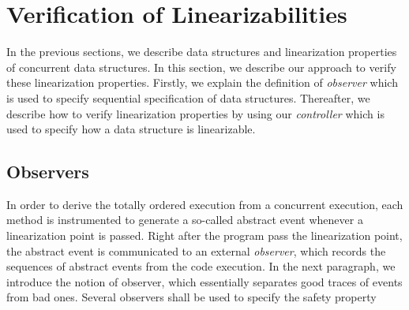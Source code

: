 \chapter{Verification of Linearizabilities}
In the previous sections, we describe data structures and linearization properties of concurrent data structures. In this section, we describe our approach to verify these linearization properties. Firstly, we explain the definition of \emph{observer} which is used to specify sequential specification of data structures. Thereafter, we describe how to verify linearization properties by using our \emph{controller} which is used to specify how a data structure is linearizable.
\section*{Observers}
\label{section:observers}

In order to derive the totally ordered execution from a concurrent
execution, each method is instrumented to generate a so-called
abstract event whenever a linearization point is passed. Right after the program pass the linearization point, the abstract event is
communicated to an external \emph{observer}, which records the sequences of
abstract events from the code execution. In the next paragraph, we introduce the notion of observer, which essentially separates good traces of events from bad ones. Several observers shall be used to specify the safety property

